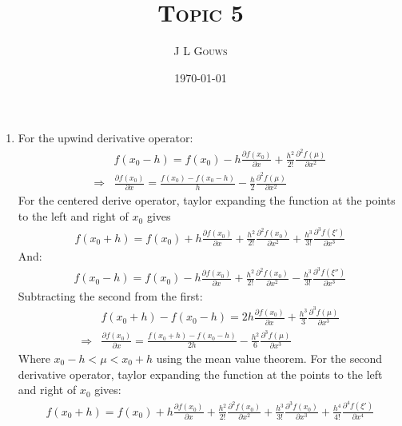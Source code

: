 \documentclass[12pt,a4]{article}
\title{
\textsc{Topic 5}
}
\author{\textsc{J L Gouws}
}
\date{\today
\\[1cm]}
\begin{document}
\thispagestyle{empty}

\maketitle

\begin{enumerate}
  \item
    For the upwind derivative operator:
    \begin{align*}
                  & f(x_0 - h) = f(x_0) - h \frac{\partial f(x_0)}{\partial x} + \frac{h^2}{2!} \frac{\partial^2 f(\mu)}{\partial x^2}\\
      \Rightarrow & \frac{\partial f(x_0)}{\partial x} = \frac{f(x_0) - f(x_0 - h)}{h} - \frac{h}{2} \frac{\partial^2 f(\mu)}{\partial x^2}
    \end{align*}
    For the centered derive operator, taylor expanding the function at the points to the left and right of $x_0$ gives
    \begin{align*}
      f(x_0 + h) = f(x_0) + h \frac{\partial f(x_0)}{\partial x} + \frac{h^2}{2!} \frac{\partial^2 f(x_0)}{\partial x^2} + \frac{h^3}{3!} \frac{\partial^3 f(\xi')}{\partial x^3} 
    \end{align*}
    And:
    \begin{align*}
      f(x_0 - h) = f(x_0) - h \frac{\partial f(x_0)}{\partial x} + \frac{h^2}{2!} \frac{\partial^2 f(x_0)}{\partial x^2} - \frac{h^3}{3!} \frac{\partial^3 f(\xi'')}{\partial x^3}
    \end{align*}
    Subtracting the second from the first:
    \begin{align*}
                  & f(x_0 + h) - f(x_0 - h) = 2 h \frac{\partial f(x_0)}{\partial x} + \frac{h^3}{3} \frac{\partial^3 f(\mu)}{\partial x^3} \\
      \Rightarrow & \frac{\partial f(x_0)}{\partial x} = \frac{f(x_0 + h) - f(x_0 - h)}{ 2 h}  - \frac{h^2}{6} \frac{\partial^3 f(\mu)}{\partial x^3} 
    \end{align*}
    Where $x_0 - h < \mu < x_0 + h$ using the mean value theorem.
    For the second derivative operator, taylor expanding the function at the points to the left and right of $x_0$ gives:
    \begin{align*}
      f(x_0 + h) = f(x_0) + h \frac{\partial f(x_0)}{\partial x} + \frac{h^2}{2!} \frac{\partial^2 f(x_0)}{\partial x^2} + \frac{h^3}{3!} \frac{\partial^3 f(x_0)}{\partial x^3} + \frac{h^4}{4!} \frac{\partial^4 f(\xi')}{\partial x^4}
    \end{align*}

\end{enumerate}
\end{document}
